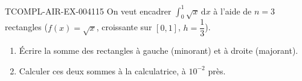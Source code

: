 \begin{exercice}{TCOMPL-AIR-EX-004}{1}{15}
On veut encadrer $\displaystyle\int_0^1 \sqrt{x}\,\mathrm{d}x$ à l'aide de $n=3$ rectangles ($f(x)=\sqrt{x}$, croissante sur $[0,1]$, $h=\dfrac{1}{3}$).
\begin{enumerate}
  \item Écrire la somme des rectangles \og à gauche \fg{} (minorant) et \og à droite \fg{} (majorant).
  \item Calculer ces deux sommes à la calculatrice, à $10^{-2}$ près.
\end{enumerate}
\end{exercice}
